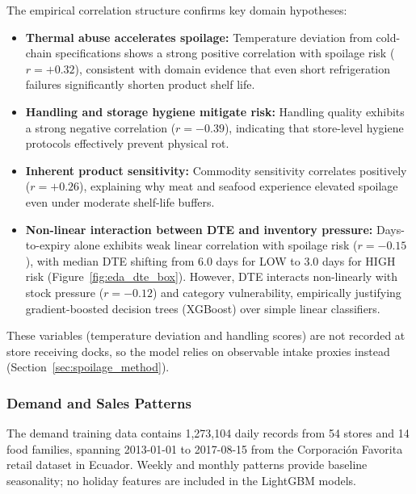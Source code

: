 \documentclass[12pt,a4paper]{article}
\renewcommand{\_}{\oldunderscore\allowbreak}
\begin{document}
The empirical correlation structure confirms key domain hypotheses:
\begin{itemize}[leftmargin=18pt, itemsep=2pt]
    \item \textbf{Thermal abuse accelerates spoilage:} Temperature deviation from cold-chain specifications shows a strong positive correlation with spoilage risk ($r = +0.32$), consistent with domain evidence that even short refrigeration failures significantly shorten product shelf life.
    \item \textbf{Handling and storage hygiene mitigate risk:} Handling quality exhibits a strong negative correlation ($r = -0.39$), indicating that store-level hygiene protocols effectively prevent physical rot.
    \item \textbf{Inherent product sensitivity:} Commodity sensitivity correlates positively ($r = +0.26$), explaining why meat and seafood experience elevated spoilage even under moderate shelf-life buffers.
    \item \textbf{Non-linear interaction between DTE and inventory pressure:} Days-to-expiry alone exhibits weak linear correlation with spoilage risk ($r = -0.15$), with median DTE shifting from 6.0 days for LOW to 3.0 days for HIGH risk (Figure~\ref{fig:eda_dte_box}). However, DTE interacts non-linearly with stock pressure ($r = -0.12$) and category vulnerability, empirically justifying gradient-boosted decision trees (XGBoost) over simple linear classifiers.
\end{itemize}
These variables (temperature deviation and handling scores) are not recorded at store receiving docks, so the model relies on observable intake proxies instead (Section~\ref{sec:spoilage_method}).

\subsubsection{Demand and Sales Patterns}
The demand training data contains 1,273,104 daily records from 54 stores and 14 food families, spanning 2013-01-01 to 2017-08-15 from the Corporación Favorita retail dataset in Ecuador. Weekly and monthly patterns provide baseline seasonality; no holiday features are included in the LightGBM models.
\end{document}

